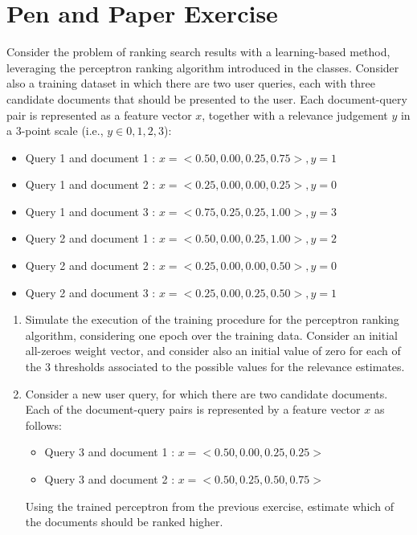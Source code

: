 \documentclass[12pt]{article}
\begin{document}
\section{Pen and Paper Exercise}

Consider the problem of ranking search results with a learning-based method, leveraging the perceptron ranking algorithm introduced in the classes. Consider also a training dataset in which there are two user queries, each with three candidate documents that should be presented to the user. Each document-query pair is represented as a feature vector $x$, together with a relevance judgement $y$ in a 3-point scale (i.e., $y \in {0,1,2,3}$):

\begin{itemize}
\item Query 1 and document 1 : $x=<0.50, 0.00, 0.25, 0.75> , y=1$
\item Query 1 and document 2 : $x=<0.25, 0.00, 0.00, 0.25> , y=0$
\item Query 1 and document 3 : $x=<0.75, 0.25, 0.25, 1.00> , y=3$

\item Query 2 and document 1 : $x=<0.50, 0.00, 0.25, 1.00> , y=2$
\item Query 2 and document 2 : $x=<0.25, 0.00, 0.00, 0.50> , y=0$
\item Query 2 and document 3 : $x=<0.25, 0.00, 0.25, 0.50> , y=1$
\end{itemize}

\begin{enumerate}
\item Simulate the execution of the training procedure for the perceptron ranking algorithm, considering one epoch over the training data. Consider an initial all-zeroes weight vector, and consider also an initial value of zero for each of the 3 thresholds associated to the possible values for the relevance estimates.

\item Consider a new user query, for which there are two candidate documents. Each of the document-query pairs is represented by a feature vector $x$ as follows:

\begin{itemize}
\item Query 3 and document 1 : $x=<0.50, 0.00, 0.25, 0.25>$
\item Query 3 and document 2 : $x=<0.50, 0.25, 0.50, 0.75>$
\end{itemize}

Using the trained perceptron from the previous exercise, estimate which of the documents should be ranked higher.
\end{enumerate}
\end{document}
